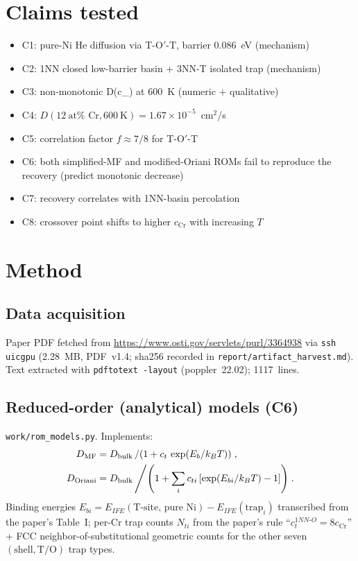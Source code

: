 \documentclass[11pt]{article}
\begin{document}
\section{Claims tested}
\begin{itemize}
  \item C1: pure-Ni He diffusion via T-O$'$-T, barrier 0.086~eV (mechanism)
  \item C2: 1NN closed low-barrier basin + 3NN-T isolated trap (mechanism)
  \item C3: non-monotonic D(c_) at 600~K (numeric + qualitative)
  \item C4: $D(12~\text{at\%~Cr}, 600~\text{K}) = 1.67 \times 10^{-5}$~cm$^2$/s
  \item C5: correlation factor $f \approx 7/8$ for T-O$'$-T
  \item C6: both simplified-MF and modified-Oriani ROMs fail to
        reproduce the recovery (predict monotonic decrease)
  \item C7: recovery correlates with 1NN-basin percolation
  \item C8: crossover point shifts to higher $c_\text{Cr}$ with increasing $T$
\end{itemize}

\section{Method}

\subsection{Data acquisition}
Paper PDF fetched from \url{https://www.osti.gov/servlets/purl/3364938}
via \texttt{ssh uicgpu} (2.28~MB, PDF~v1.4; sha256 recorded in
\texttt{report/artifact\_harvest.md}). Text extracted with
\texttt{pdftotext -layout} (poppler~22.02); 1117~lines.

\subsection{Reduced-order (analytical) models (C6)}
\texttt{work/rom\_models.py}. Implements:
\begin{align}
  D_\text{MF} &= D_\text{bulk} \left/ \left(1 + c_t\,\exp(E_b/k_B T)\right)\right., \\
  D_\text{Oriani} &= D_\text{bulk} \left/ \left(1 + \sum_i c_{ti}\left[\exp(E_{bi}/k_B T) - 1\right]\right)\right. .
\end{align}
Binding energies $E_{bi} = E_{IFE}(\text{T-site, pure Ni}) - E_{IFE}(\text{trap}_i)$
transcribed from the paper's Table~I; per-Cr trap counts $N_{ti}$ from
the paper's rule ``$c_t^{1NN\text{-}O} = 8 c_\text{Cr}$'' + FCC
neighbor-of-substitutional geometric counts for the other seven
$(\text{shell}, \text{T/O})$ trap types.
\end{document}
